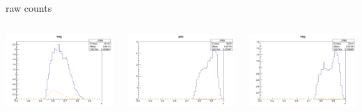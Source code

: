 \begin{frame}{raw counts}
\begin{columns}
\begin{column}[T]{0.25\textwidth}
\includegraphics[width = \textwidth]{results/yield/statistics/yield_x_Q2_z_0.60_5.500_0.65_neg.png}
\end{column}
\begin{column}[T]{0.25\textwidth}
\includegraphics[width = \textwidth]{results/yield/statistics/yield_x_Q2_z_0.60_5.500_0.90_pos.png}
\end{column}
\begin{column}[T]{0.25\textwidth}
\includegraphics[width = \textwidth]{results/yield/statistics/yield_x_Q2_z_0.60_5.500_0.90_neg.png}
\end{column}
\end{columns}
\end{frame}
